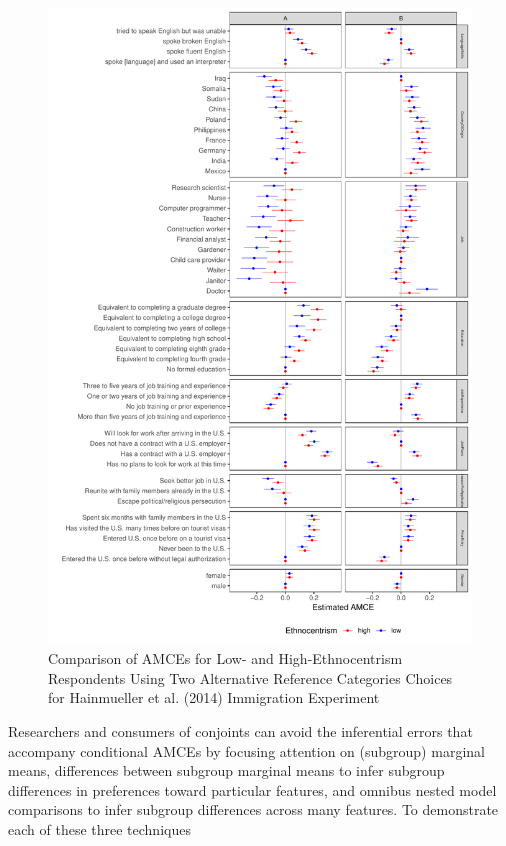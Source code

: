 \documentclass[a4paper,12pt]{article}\usepackage[]{graphicx}\usepackage[]{color}
\makeatletter
\def\maxwidth{ %
  \ifdim\Gin@nat@width>\linewidth
    \linewidth
  \else
    \Gin@nat@width
  \fi
}
\newenvironment{knitrout}{}{} %
\makeatother
\begin{document}
\begin{knitrout}
\color{fgcolor}\begin{figure}
\includegraphics[width=\maxwidth]{figure/hainmueller_subgroup_example_plot-1} \caption[Comparison of AMCEs for Low- and High-Ethnocentrism Respondents Using Two Alternative Reference Categories Choices for Hainmueller et al]{Comparison of AMCEs for Low- and High-Ethnocentrism Respondents Using Two Alternative Reference Categories Choices for Hainmueller et al. (2014) Immigration Experiment}\label{fig:hainmueller_subgroup_example_plot}
\end{figure}


\end{knitrout}

Researchers and consumers of conjoints can avoid the inferential errors that accompany conditional AMCEs by focusing attention on (subgroup) marginal means, differences between subgroup marginal means to infer subgroup differences in preferences toward particular features, and omnibus nested model comparisons to infer subgroup differences across many features. To demonstrate each of these three techniques
\end{document}
